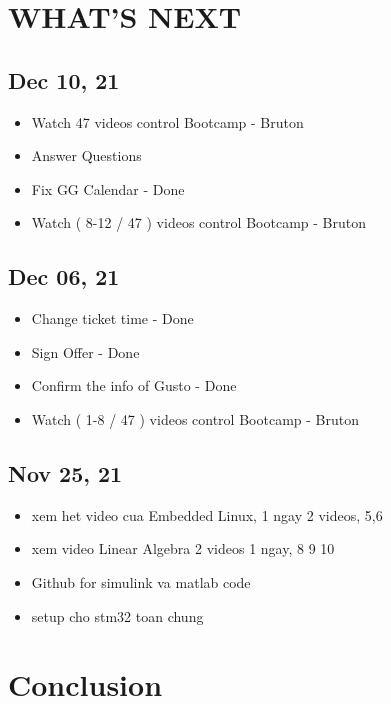 \documentclass{article}
\begin{document}
\section{WHAT'S NEXT}

\subsection{Dec 10, 21}
\begin{itemize}
  \item Watch 47 videos control Bootcamp - Bruton
  \item Answer Questions
  \item Fix GG Calendar - Done
  \item Watch ( 8-12 / 47 ) videos control Bootcamp - Bruton
\end{itemize}

\subsection{Dec 06, 21}
\begin{itemize}
  \item Change ticket time - Done
  \item Sign Offer - Done
  \item Confirm the info of Gusto - Done
  \item Watch ( 1-8 / 47 ) videos control Bootcamp - Bruton
\end{itemize}

\subsection{Nov 25, 21}
\begin{itemize}
  \item xem het video cua Embedded Linux, 1 ngay 2 videos, 5,6 
  \item xem video Linear Algebra 2 videos 1 ngay, 8 9 10
  \item Github for simulink va matlab code
  \item setup cho stm32 toan chung
\end{itemize}


\section{Conclusion}


\printbibliography[title=References]
% 
\end{document}
